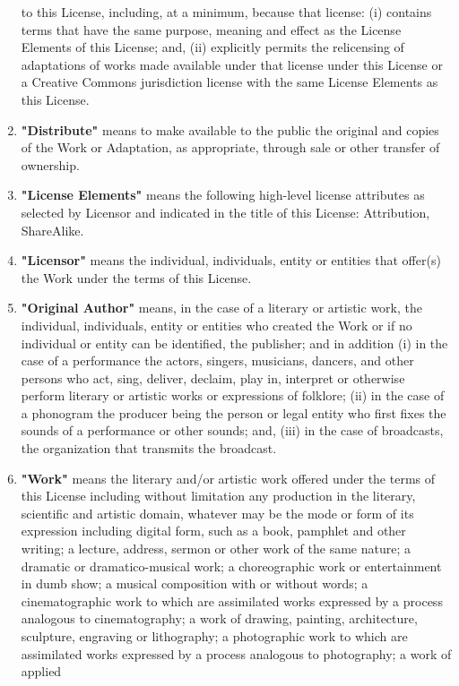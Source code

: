 \begin{enumerate}
  to this License, including, at a minimum, because that license: (i)
  contains terms that have the same purpose, meaning and effect as
  the License Elements of this License; and, (ii) explicitly permits
  the relicensing of adaptations of works made available under that
  license under this License or a Creative Commons jurisdiction
  license with the same License Elements as this License.
\item
  \textbf{"Distribute"} means to make available to the public the
  original and copies of the Work or Adaptation, as appropriate,
  through sale or other transfer of ownership.
\item
  \textbf{"License Elements"} means the following high-level license
  attributes as selected by Licensor and indicated in the title of
  this License: Attribution, ShareAlike.
\item
  \textbf{"Licensor"} means the individual, individuals, entity or
  entities that offer(s) the Work under the terms of this License.
\item
  \textbf{"Original Author"} means, in the case of a literary or
  artistic work, the individual, individuals, entity or entities who
  created the Work or if no individual or entity can be identified,
  the publisher; and in addition (i) in the case of a performance the
  actors, singers, musicians, dancers, and other persons who act,
  sing, deliver, declaim, play in, interpret or otherwise perform
  literary or artistic works or expressions of folklore; (ii) in the
  case of a phonogram the producer being the person or legal entity
  who first fixes the sounds of a performance or other sounds; and,
  (iii) in the case of broadcasts, the organization that transmits
  the broadcast.
\item
  \textbf{"Work"} means the literary and/or artistic work offered
  under the terms of this License including without limitation any
  production in the literary, scientific and artistic domain,
  whatever may be the mode or form of its expression including
  digital form, such as a book, pamphlet and other writing; a
  lecture, address, sermon or other work of the same nature; a
  dramatic or dramatico-musical work; a choreographic work or
  entertainment in dumb show; a musical composition with or without
  words; a cinematographic work to which are assimilated works
  expressed by a process analogous to cinematography; a work of
  drawing, painting, architecture, sculpture, engraving or
  lithography; a photographic work to which are assimilated works
  expressed by a process analogous to photography; a work of applied

\end{enumerate}
